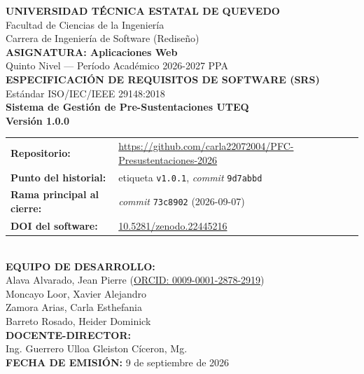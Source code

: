 \documentclass[11pt,a4paper]{article}
\title{}\date{}
\begin{document}
\begin{titlepage}
\centering
\vspace*{0.8cm}
{\LARGE \textbf{UNIVERSIDAD TÉCNICA ESTATAL DE QUEVEDO}}\\[0.3cm]
{\large Facultad de Ciencias de la Ingeniería}\\[0.2cm]
{\large Carrera de Ingeniería de Software (Rediseño)}\\[0.8cm]

{\large \textbf{ASIGNATURA: Aplicaciones Web}}\\[0.3cm]
{\large Quinto Nivel --- Período Académico 2026-2027 PPA}\\[1.0cm]

{\Large \textbf{ESPECIFICACIÓN DE REQUISITOS DE SOFTWARE (SRS)}}\\[0.3cm]
{\large Estándar ISO/IEC/IEEE 29148:2018}\\[0.6cm]
{\LARGE \textbf{Sistema de Gestión de Pre-Sustentaciones UTEQ}}\\[0.6cm]
{\Large \textbf{Versión 1.0.0}}\\[0.9cm]

\small\begin{tabular}{ll}
\textbf{Repositorio:} & \url{https://github.com/carla22072004/PFC-Presustentaciones-2026} \\
\textbf{Punto del historial:} & etiqueta \texttt{v1.0.1}, \emph{commit} \texttt{9d7abbd} \\
\textbf{Rama principal al cierre:} & \emph{commit} \texttt{73c8902} (2026-09-07) \\
\textbf{DOI del software:} & \href{https://doi.org/10.5281/zenodo.22445216}{10.5281/zenodo.22445216} \\
\end{tabular}\normalsize\\[1.0cm]

{\large \textbf{EQUIPO DE DESARROLLO:}}\\[0.3cm]
{\large Alava Alvarado, Jean Pierre \quad (\href{https://orcid.org/0009-0001-2878-2919}{ORCID: 0009-0001-2878-2919})}\\[0.1cm]
{\large Moncayo Loor, Xavier Alejandro}\\[0.1cm]
{\large Zamora Arias, Carla Esthefania}\\[0.1cm]
{\large Barreto Rosado, Heider Dominick}\\[0.8cm]

{\large \textbf{DOCENTE-DIRECTOR:}}\\[0.3cm]
{\large Ing. Guerrero Ulloa Gleiston Cíceron, Mg.}\\[0.8cm]

{\large \textbf{FECHA DE EMISIÓN:} 9 de septiembre de 2026}\\[0.3cm]
\end{titlepage}
\end{document}

